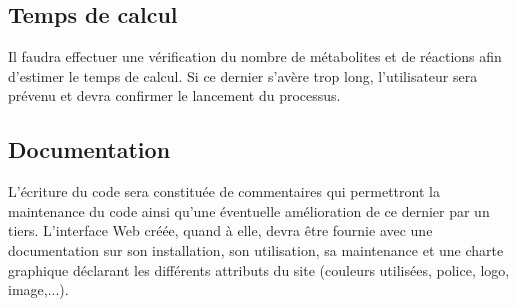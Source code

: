 \subsection{Temps de calcul}
Il faudra effectuer une vérification du nombre de métabolites et de réactions afin d'estimer le temps de calcul. Si ce dernier s'avère trop long, l'utilisateur sera prévenu et devra confirmer le lancement du processus. 

\subsection{Documentation}
L'écriture du code sera constituée de commentaires qui permettront la maintenance du code ainsi qu'une éventuelle amélioration de ce dernier par un tiers.
L'interface Web créée, quand à elle, devra être fournie avec une documentation sur son installation, son utilisation, sa maintenance et une charte graphique déclarant les différents attributs du site (couleurs utilisées, police, logo, image,...).

